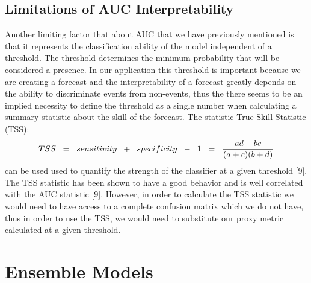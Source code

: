 \subsection{Limitations of AUC Interpretability}
\noindent Another limiting factor that about AUC that we have previously mentioned is that it represents the classification ability of the model independent of a threshold. The threshold determines the minimum probability that will be considered a presence. In our application this threshold is important because we are creating a forecast and the interpretability of a forecast greatly depends on the ability to discriminate events from non-events, thus the there seems to be an implied necessity to define the threshold as a single number when calculating a summary statistic about the skill of the forecast. The statistic True Skill Statistic (TSS):
\begin{equation}
TSS \hspace{0.2cm} = \hspace{0.2cm} sensitivity \hspace{0.2cm} + \hspace{0.2cm} specificity\hspace{0.2cm}  -\hspace{0.2cm} 1 \hspace{0.2cm} =  \hspace{0.2cm} \frac{ad -bc}{(a+c)(b+d)}
\end{equation}
can be used used to quantify the strength of the classifier at a given threshold [9]. The TSS statistic has been shown to have a good behavior and is well correlated with the AUC statistic [9]. However, in order to calculate the TSS statistic we would need to have access to a complete confusion matrix which we do not have, thus in order to use the TSS, we would need to substitute our proxy metric calculated at a given threshold. \newline





\section{Ensemble Models}

